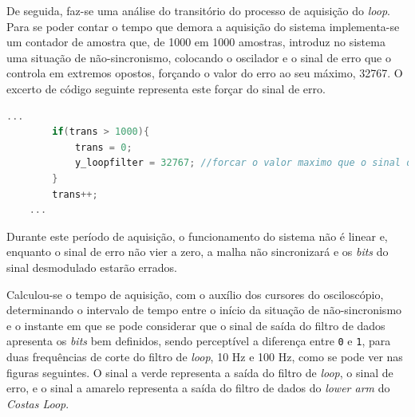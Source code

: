 \documentclass[11pt]{article}
\numberwithin{equation}{section}
\begin{document}
De seguida, faz-se uma análise do transitório do processo de aquisição do \textit{loop}. Para se poder contar o tempo que demora a aquisição do sistema implementa-se um contador de amostra que, de 1000 em 1000 amostras, introduz no sistema uma situação de não-sincronismo, colocando o oscilador e o sinal de erro que o controla em extremos opostos, forçando o valor do erro ao seu máximo, 32767. O excerto de código seguinte representa este forçar do sinal de erro.

\begin{lstlisting}[language=C]
	...
		if(trans > 1000){
			trans = 0;
			y_loopfilter = 32767; //forcar o valor maximo que o sinal de erro pode tomar
		}	
		trans++;
	...
\end{lstlisting}

Durante este período de aquisição, o funcionamento do sistema não é linear e, enquanto o sinal de erro não vier a zero, a malha não sincronizará e os \textit{bits} do sinal desmodulado estarão errados.

Calculou-se o tempo de aquisição, com o auxílio dos cursores do osciloscópio, determinando o intervalo de tempo entre o início da situação de não-sincronismo  e o instante em que se pode considerar que o sinal de saída do filtro de dados apresenta os \textit{bits} bem definidos, sendo perceptível a diferença entre \texttt{0} e \texttt{1}, para duas frequências de corte do filtro de \textit{loop}, 10 Hz e 100 Hz, como se pode ver nas figuras seguintes. O sinal a verde representa a saída do filtro de \textit{loop}, o sinal de erro, e o sinal a amarelo representa a saída do filtro de dados do \textit{lower arm} do \textit{Costas Loop}.

\end{document}
